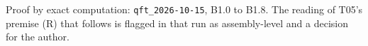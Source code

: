 Proof by exact computation: \texttt{qft\_2026-10-15}, B1.0 to B1.8. The reading of T05's premise (R) that follows is flagged in that run as assembly-level and a decision for the author.
